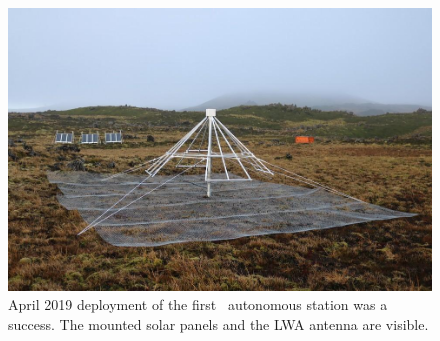 \begin{figure}
	\centering
	\includegraphics[width=\linewidth]{Figures/station}
	\caption{April 2019 deployment of the first \albatros\ autonomous station was a success. The mounted solar panels and the LWA antenna are visible.}
	\label{Fig:station}
\end{figure}
